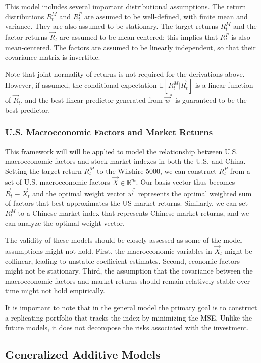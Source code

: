 This model includes several important distributional assumptions. The return distributions $R_t^M$ and $R_t^P$ are assumed to be well-defined, with finite mean and variance. They are also assumed to be stationary. The target returns $R_t^M$ and the factor returns $\vec{R}_t$ are assumed to be mean-centered; this implies that $R_t^P$ is also mean-centered. The factors are assumed to be linearly independent, so that their covariance matrix is invertible. 

Note that joint normality of returns is not required for the derivations above. However, if assumed, the conditional expectation $\mathbb{E}[R_t^M|\vec{R}_t]$ is a linear function of $\vec{R}_t$, and the best linear predictor generated from $\vec{w}^*$ is guaranteed to be the best predictor. 

\subsubsection{U.S. Macroeconomic Factors and Market Returns}

This framework will will be applied to model the relationship between U.S. macroeconomic factors and stock market indexes in both the U.S. and China. Setting the target return $R_t^M$ to the Wilshire 5000, we can construct $R_t^P$ from a set of U.S. macroeconomic factors $\vec{X}\in\mathbb{R}^m$. Our basis vector thus becomes $\vec{R}_t\equiv \vec{X}_t$ and the optimal weight vector $\vec{w}^*$ represents the optimal weighted sum of factors that best approximates the US market returns. Similarly, we can set $R_t^M$ to a Chinese market index that represents Chinese market returns, and we can analyze the optimal weight vector. 

The validity of these models should be closely assessed as some of the model assumptions might not hold. First, the macroeconomic variables in $\vec{X}_t$ might be collinear, leading to unstable coefficient estimates. Second, economic factors might not be stationary. Third, the assumption that the covariance between the macroeconomic factors and market returns should remain relatively stable over time might not hold empirically.

It is important to note that in the general model the primary goal is to construct a replicating portfolio that tracks the index by minimizing the MSE. Unlike the future models, it does not decompose the risks associated with the investment.

\subsection{Generalized Additive Models}

